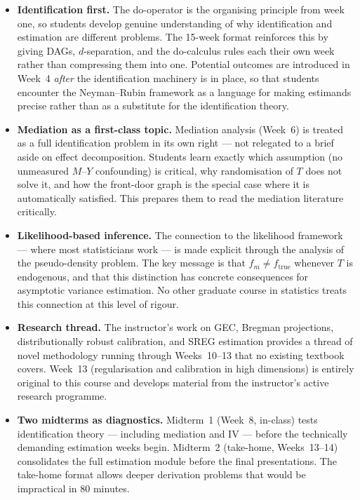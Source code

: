 \documentclass[12pt]{article}
\begin{document}
\begin{itemize}
  \item \textbf{Identification first.}
    The do-operator is the organising principle from week one, so students
    develop genuine understanding of why identification and estimation are
    different problems.  The 15-week format reinforces this by giving
    DAGs, $d$-separation, and the do-calculus rules each their own week
    rather than compressing them into one.  Potential outcomes are
    introduced in Week~4 \emph{after} the identification machinery is
    in place, so that students encounter the Neyman--Rubin framework as
    a language for making estimands precise rather than as a substitute
    for the identification theory.

  \item \textbf{Mediation as a first-class topic.}
    Mediation analysis (Week~6) is treated as a full identification problem
    in its own right --- not relegated to a brief aside on effect
    decomposition.  Students learn exactly which assumption (no unmeasured
    $M$--$Y$ confounding) is critical, why randomisation of $T$ does not
    solve it, and how the front-door graph is the special case where it is
    automatically satisfied.  This prepares them to read the mediation
    literature critically.

  \item \textbf{Likelihood-based inference.}
    The connection to the likelihood framework --- where most statisticians
    work --- is made explicit through the analysis of the pseudo-density
    problem.  The key message is that $f_m \neq f_{\mathrm{true}}$ whenever
    $T$ is endogenous, and that this distinction has concrete consequences
    for asymptotic variance estimation.  No other graduate course in
    statistics treats this connection at this level of rigour.

  \item \textbf{Research thread.}
    The instructor's work on GEC, Bregman projections, distributionally
    robust calibration, and SREG estimation provides a thread of novel
    methodology running through Weeks~10--13 that no existing textbook
    covers.  Week~13 (regularisation and calibration in high dimensions)
    is entirely original to this course and develops material from the
    instructor's active research programme.

  \item \textbf{Two midterms as diagnostics.}
    Midterm~1 (Week~8, in-class) tests identification theory --- including
    mediation and IV --- before the technically demanding estimation weeks
    begin.  Midterm~2 (take-home, Weeks~13--14) consolidates the full
    estimation module before the final presentations.  The take-home format
    allows deeper derivation problems that would be impractical in 80 minutes.
\end{itemize}
\end{document}
